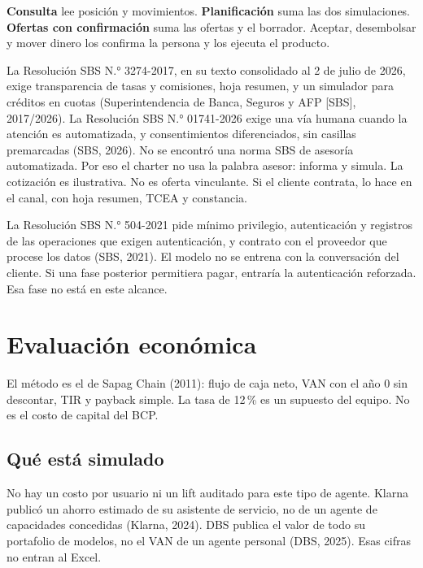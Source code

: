 \documentclass[11pt]{article}
\begin{document}
\textbf{Consulta} lee posición y movimientos. \textbf{Planificación} suma las dos simulaciones. \textbf{Ofertas con confirmación} suma las ofertas y el borrador. Aceptar, desembolsar y mover dinero los confirma la persona y los ejecuta el producto.

La Resolución SBS N.° 3274-2017, en su texto consolidado al 2 de julio de 2026, exige transparencia de tasas y comisiones, hoja resumen, y un simulador para créditos en cuotas (Superintendencia de Banca, Seguros y AFP [SBS], 2017/2026). La Resolución SBS N.° 01741-2026 exige una vía humana cuando la atención es automatizada, y consentimientos diferenciados, sin casillas premarcadas (SBS, 2026). No se encontró una norma SBS de asesoría automatizada. Por eso el charter no usa la palabra asesor: informa y simula. La cotización es ilustrativa. No es oferta vinculante. Si el cliente contrata, lo hace en el canal, con hoja resumen, TCEA y constancia.

La Resolución SBS N.° 504-2021 pide mínimo privilegio, autenticación y registros de las operaciones que exigen autenticación, y contrato con el proveedor que procese los datos (SBS, 2021). El modelo no se entrena con la conversación del cliente. Si una fase posterior permitiera pagar, entraría la autenticación reforzada. Esa fase no está en este alcance.

\section{Evaluación económica}

El método es el de Sapag Chain (2011): flujo de caja neto, VAN con el año 0 sin descontar, TIR y payback simple. La tasa de 12\,\% es un supuesto del equipo. No es el costo de capital del BCP.

\subsection{Qué está simulado}

No hay un costo por usuario ni un lift auditado para este tipo de agente. Klarna publicó un ahorro estimado de su asistente de servicio, no de un agente de capacidades concedidas (Klarna, 2024). DBS publica el valor de todo su portafolio de modelos, no el VAN de un agente personal (DBS, 2025). Esas cifras no entran al Excel.
\end{document}
